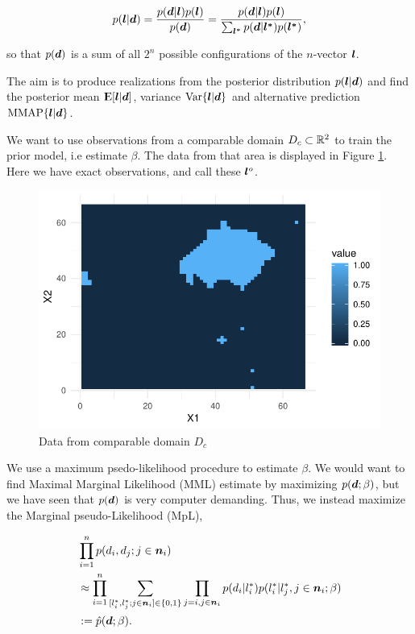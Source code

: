 \begin{equation*}
    p(\bm{l}|\bm{d}) = \frac{p(\bm{d}|\bm{l})p(\bm{l})}{p(\bm{d})} = \frac{p(\bm{d}|\bm{l})p(\bm{l})}{\sum_{\bm{l^*}}p(\bm{d}|\bm{l^*})p(\bm{l^*})} ,
\end{equation*}

so that  $p(\bm{d})$ is a sum of all $2^n$ possible configurations of the $n$-vector $\bm{l}$.

The aim is to produce realizations from the posterior distribution $p(\bm{l}|\bm{d})$ and find the posterior mean ${\rm I\kern-.3em E}[\bm{l} | \bm{d}]$, variance $\mathrm{Var}\{\bm{l} | \bm{d}\}$ and alternative prediction $\textrm{MMAP}\{\bm{l} | \bm{d}\}$. 

We want to use observations from a comparable domain $D_c \subset \mathbb{R}^2$ to train the prior model, i.e estimate $\beta$. The data from that area is displayed in Figure \ref{fig:complit_data}. Here we have exact observations, and call these $\bm{l}^o$.

\begin{figure}
    \centering
    \includegraphics[scale=0.95]{figures/complit_data.pdf}
    \caption{Data from comparable domain $D_c$}
    \label{fig:complit_data}
\end{figure}


We use a maximum psedo-likelihood procedure to estimate $\beta$. We would want to find Maximal Marginal Likelihood (MML) estimate by maximizing $p(\bm{d}; \beta)$, but we have seen that $p(\bm{d})$ is very computer demanding. Thus, we instead maximize the Marginal pseudo-Likelihood (MpL), 

\begin{align*}
     &\prod_{i=1}^n p(d_i, d_j; j \in \bm{n}_i)\\
    &\approx \prod_{i=1}^n \sum_{[l_i^*, l_j^*; j\in \bm{n}_i] \in \{0,1\}} \prod_{j=i, j\in \bm{n}_i} p(d_i|l_i^*)p(l_i^*|l_j^*, j\in \bm{n}_i; \beta)\\
    &:= \hat{p}(\bm{d}; \beta).
\end{align*}
 
